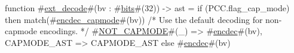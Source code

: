 function #\hyperref[sailRISCVzextzydecode]{ext\_decode}#(bv : #\hyperref[sailRISCVzbits]{bits}#(32)) -> ast = {
  if (PCC.flag_cap_mode) then {
    match(#\hyperref[sailRISCVzencdeczycapmode]{encdec\_capmode}#(bv)) {
      /* Use the default decoding for non-capmode encodings. */
      #\hyperref[sailRISCVzNOTzyCAPMODE]{NOT\_CAPMODE}#(_) => #\hyperref[sailRISCVzencdec]{encdec}#(bv),
      CAPMODE_AST => CAPMODE_AST
    }
  } else #\hyperref[sailRISCVzencdec]{encdec}#(bv)
}
